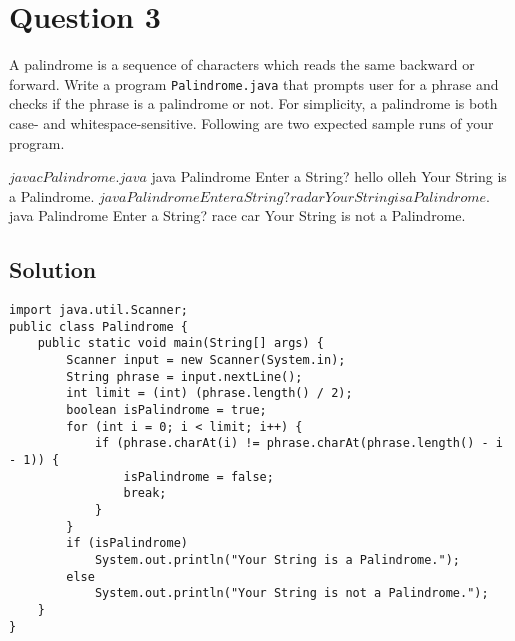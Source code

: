 \newpage

\section*{Question 3}
A palindrome is a sequence of characters which reads the same backward or forward.
Write a program \texttt{Palindrome.java} that prompts user for a phrase and checks if the phrase is a palindrome or not.
For simplicity, a palindrome is both case- and whitespace-sensitive.
Following are two expected sample runs of your program.

\begin{terminal}
$ javac Palindrome.java
$ java Palindrome
Enter a String? hello olleh
Your String is a Palindrome.
$ java Palindrome
Enter a String? radar
Your String is a Palindrome.
$ java Palindrome
Enter a String? race car
Your String is not a Palindrome.
\end{terminal}

\subsection*{Solution}
\lstset{language=Java,tabsize=2}
\begin{lstlisting}
import java.util.Scanner;
public class Palindrome {
	public static void main(String[] args) {
		Scanner input = new Scanner(System.in);
		String phrase = input.nextLine();
		int limit = (int) (phrase.length() / 2);
		boolean isPalindrome = true;
		for (int i = 0; i < limit; i++) {
			if (phrase.charAt(i) != phrase.charAt(phrase.length() - i - 1)) {
				isPalindrome = false;
				break;
			}
		}
		if (isPalindrome)
			System.out.println("Your String is a Palindrome.");
		else
			System.out.println("Your String is not a Palindrome.");
	}
}
\end{lstlisting}
